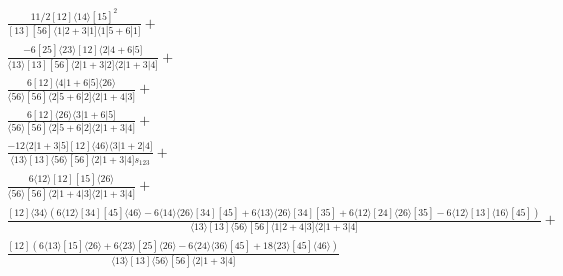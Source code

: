 \documentclass[varwidth, border=5pt]{standalone}
\begin{document}
\begin{my}
$\begin{gathered}
\scriptscriptstyle\frac{11/2[12]⟨14⟩[15]^2}{[13][56]⟨1|2+3|1]⟨1|5+6|1]}+\\
\scriptscriptstyle\frac{-6[25]⟨23⟩[12]⟨2|4+6|5]}{⟨13⟩[13][56]⟨2|1+3|2]⟨2|1+3|4]}+\\
\scriptscriptstyle\frac{6[12]⟨4|1+6|5]⟨26⟩}{⟨56⟩[56]⟨2|5+6|2]⟨2|1+4|3]}+\\
\scriptscriptstyle\frac{6[12]⟨26⟩⟨3|1+6|5]}{⟨56⟩[56]⟨2|5+6|2]⟨2|1+3|4]}+\\
\scriptscriptstyle\frac{-12⟨2|1+3|5][12]⟨46⟩⟨3|1+2|4]}{⟨13⟩[13]⟨56⟩[56]⟨2|1+3|4]s_{123}}+\\
\scriptscriptstyle\frac{6⟨12⟩[12][15]⟨26⟩}{⟨56⟩[56]⟨2|1+4|3]⟨2|1+3|4]}+\\
\scriptscriptstyle\frac{[12]⟨34⟩\scriptscriptstyle(6⟨12⟩[34][45]⟨46⟩-6⟨14⟩⟨26⟩[34][45]+6⟨13⟩⟨26⟩[34][35]+6⟨12⟩[24]⟨26⟩[35]-6⟨12⟩[13]⟨16⟩[45])}{⟨13⟩[13]⟨56⟩[56]⟨1|2+4|3]⟨2|1+3|4]}+\\
\scriptscriptstyle\frac{[12]\scriptscriptstyle(6⟨13⟩[15]⟨26⟩+6⟨23⟩[25]⟨26⟩-6⟨24⟩⟨36⟩[45]+18⟨23⟩[45]⟨46⟩)}{⟨13⟩[13]⟨56⟩[56]⟨2|1+3|4]}\phantom{+}
\end{gathered}$
\end{my}
\end{document}
